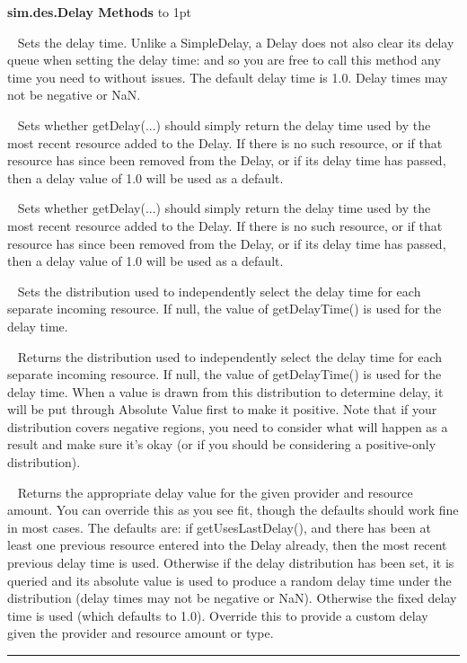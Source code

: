 \documentclass[twoside,10pt]{article}
\newcommand\class[1]{\index{Classes!{#1}}\textsf{#1}}
\newcommand*{\xfill}[1][0pt]{%
	\cleaders
		\hbox to 1pt{\hss
			\raisebox{#1}{\rule{1.2pt}{0.4pt}}%
			\hss}\hfill}
\newenvironment{methods}[1]{
\vspace{1.0em}\noindent\textsf{\textbf{#1 Methods}}\quad \xfill[0.5ex]
\vspace{-0.25em}
\begin{description}
\small}
{\end{description}\hrule\vspace{1.5em}}
\newcommand{\mthd}[1]{\item[{\sf #1}]~\newline}
\begin{document}
\begin{methods}{\class{sim.des.Delay}}
\mthd{public void setDelayTime(double delayTime)}
Sets the delay time.  Unlike a SimpleDelay, a Delay does not also clear its delay queue
    	when setting the delay time: and so you are free to call this method any time you need 
    	to without issues.  The default delay time is 1.0. Delay times may not be negative or NaN.  
    	
\mthd{public void setUsesLastDelay(boolean val)}
Sets whether getDelay(...) should simply return the delay time used by the most recent resource
    	added to the Delay.  If there is no such resource, or if that resource has since been 
    	removed from the Delay, or if its delay time has passed, then a delay value of 1.0 will
    	be used as a default.
	
\mthd{public boolean getUsesLastDelay()}
Sets whether getDelay(...) should simply return the delay time used by the most recent resource
    	added to the Delay. If there is no such resource, or if that resource has since been 
    	removed from the Delay, or if its delay time has passed, then a delay value of 1.0 will
    	be used as a default.
	
\mthd{public void setDelayDistribution(AbstractDistribution distribution)}
Sets the distribution used to independently select the delay time for each separate incoming 
        resource.  If null, the value of getDelayTime() is used for the delay time.
        
\mthd{public AbstractDistribution getDelayDistribution()}
 Returns the distribution used to independently select the delay time for each separate incoming 
        resource.  If null, the value of getDelayTime() is used for the delay time.  
        When a value is drawn from this distribution to determine
        delay, it will be put through Absolute Value first to make it positive.  Note that if your 
        distribution covers negative regions, you need to consider what will happen as a result and 
        make sure it's okay (or if you should be considering a positive-only distribution).
        
\mthd{protected double getDelay(Provider provider, Resource amount)}
Returns the appropriate delay value for the given provider and resource amount.
    	You can override this as you see fit, though the defaults should work fine in most 
    	cases.  The defaults are: if getUsesLastDelay(), and there has been at least one 
    	previous resource entered into the Delay already, then the most recent previous 
    	delay time is used.  Otherwise if the delay distribution has been set, it is queried
    	and its absolute value is used to produce a random delay time under the distribution
    	(delay times may not be negative or NaN).  Otherwise the fixed delay time is used 
    	(which defaults to 1.0).  Override this to provide a custom delay given the 
        provider and resource amount or type.
        

\end{methods}
\end{document}

